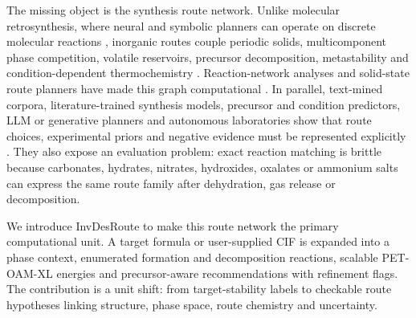 \documentclass[11pt, letterpaper]{article}
\newcommand{\invdesroute}{InvDesRoute}
\begin{document}
The missing object is the synthesis route network. Unlike molecular retrosynthesis, where neural and symbolic planners can operate on discrete molecular reactions \cite{segler2018synthesis_planning}, inorganic routes couple periodic solids, multicomponent phase competition, volatile reservoirs, precursor decomposition, metastability and condition-dependent thermochemistry \cite{sun2016metastability,aykol2018metastable_limit,mcdermott2023selectivity}. Reaction-network analyses and solid-state route planners have made this graph computational \cite{aykol2019network_analysis,aykol2021routes,mcdermott2021graph}. In parallel, text-mined corpora, literature-trained synthesis models, precursor and condition predictors, LLM or generative planners and autonomous laboratories show that route choices, experimental priors and negative evidence must be represented explicitly \cite{olivetti2020nlp_materials,kononova2019textmined,kim2020literature_synthesis_planning,huo2022conditions,he2023precursor,szymanski2023arrows3,kim2024llm,pan2026diffsyn,szymanski2023alab}. They also expose an evaluation problem: exact reaction matching is brittle because carbonates, hydrates, nitrates, hydroxides, oxalates or ammonium salts can express the same route family after dehydration, gas release or decomposition.

We introduce \invdesroute{} to make this route network the primary computational unit. A target formula or user-supplied CIF is expanded into a phase context, enumerated formation and decomposition reactions, scalable PET-OAM-XL energies and precursor-aware recommendations with refinement flags. The contribution is a unit shift: from target-stability labels to checkable route hypotheses linking structure, phase space, route chemistry and uncertainty.
\end{document}
